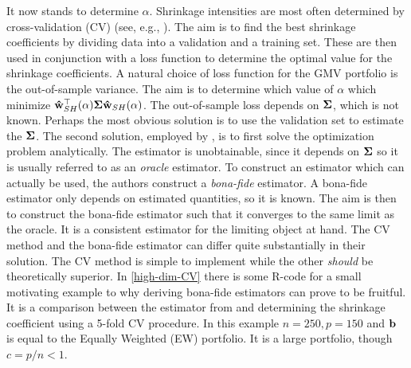 \documentclass[12pt, twoside]{book}\usepackage{knitr}
\begin{document}
It now stands to determine $\alpha$. 
Shrinkage intensities are most often determined by cross-validation (CV) (see, e.g., \citet[ch. 5]{james2013introduction}). 
The aim is to find the best shrinkage coefficients by dividing data into a validation and a training set.
These are then used in conjunction with a loss function to determine the optimal value for the shrinkage coefficients.
A natural choice of loss function for the GMV portfolio is the out-of-sample variance.
The aim is to determine which value of $\alpha$ which minimize $\mathbf{\hat{w}}_{SH}^\top(\alpha) \mathbf{\Sigma} \mathbf{\hat{w}}_{SH}(\alpha)$.
The out-of-sample loss depends on $\mathbf{\Sigma}$, which is not known.
Perhaps the most obvious solution is to use the validation set to estimate the $\mathbf{\Sigma}$.
The second solution, employed by \citet{bodnar2018estimation}, is to first solve the optimization problem analytically.
The estimator is unobtainable, since it depends on $\mathbf{\Sigma}$ so it is usually referred to as an \textit{oracle} estimator. 
To construct an estimator which can actually be used, the authors construct a \textit{bona-fide} estimator.
A bona-fide estimator only depends on estimated quantities, so it is known.
The aim is then to construct the bona-fide estimator such that it converges to the same limit as the oracle. 
It is a consistent estimator for the limiting object at hand.
The CV method and the bona-fide estimator can differ quite substantially in their solution. 
The CV method is simple to implement while the other \textit{should} be theoretically superior.
In \ref{high-dim-CV} there is some R-code for a small motivating example to why deriving bona-fide estimators can prove to be fruitful.
It is a comparison between the estimator from \citet{bodnar2018estimation} and determining the shrinkage coefficient using a 5-fold CV procedure.
In this example $n=250, p=150$ and $\mathbf{b}$ is equal to the Equally Weighted (EW) portfolio.
It is a large portfolio, though $c=p/n<1$.
\end{document}
